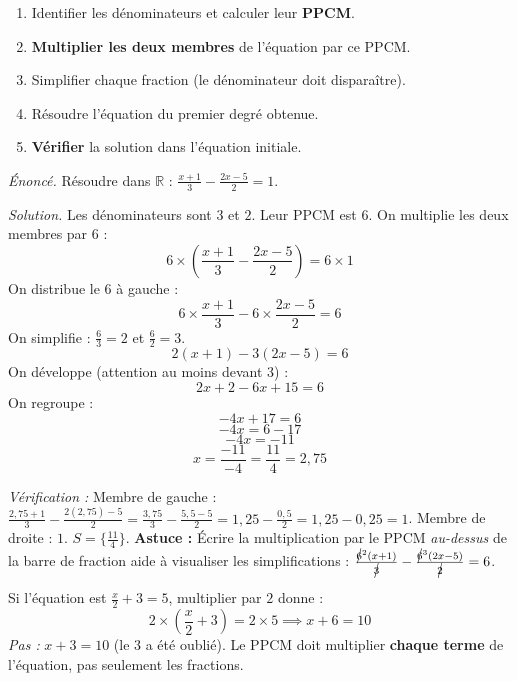 \documentclass[11pt]{article}
\begin{document}
\begin{methode}
\leavevmode
\begin{enumerate}
    \item Identifier les dénominateurs et calculer leur \textbf{PPCM}.
    \item \textbf{Multiplier les deux membres} de l'équation par ce PPCM.
    \item Simplifier chaque fraction (le dénominateur doit disparaître).
    \item Résoudre l'équation du premier degré obtenue.
    \item \textbf{Vérifier} la solution dans l'équation initiale.
\end{enumerate}
\end{methode}

\begin{exoresolu}[Équation fractionnaire : $\frac{x+1}{3} - \frac{2x-5}{2} = 1$]
\emph{Énoncé.} Résoudre dans $\mathbb{R}$ : $\frac{x+1}{3} - \frac{2x-5}{2} = 1$.

\emph{Solution.}
Les dénominateurs sont $3$ et $2$. Leur PPCM est $6$.
On multiplie les deux membres par $6$ :
\[ 6 \times \left( \frac{x+1}{3} - \frac{2x-5}{2} \right) = 6 \times 1 \]
On distribue le $6$ à gauche :
\[ 6 \times \frac{x+1}{3} - 6 \times \frac{2x-5}{2} = 6 \]
On simplifie : $\frac{6}{3}=2$ et $\frac{6}{2}=3$.
\[ 2(x+1) - 3(2x-5) = 6 \]
On développe (attention au moins devant $3$) :
\[ 2x + 2 - 6x + 15 = 6 \]
On regroupe :
\[ -4x + 17 = 6 \]
\[ -4x = 6 - 17 \]
\[ -4x = -11 \]
\[ x = \frac{-11}{-4} = \frac{11}{4} = 2,75 \]

\emph{Vérification :}
Membre de gauche : $\frac{2,75+1}{3} - \frac{2(2,75)-5}{2} = \frac{3,75}{3} - \frac{5,5-5}{2} = 1,25 - \frac{0,5}{2} = 1,25 - 0,25 = 1$.
Membre de droite : $1$. \quad $S = \{\frac{11}{4}\}$.
\tcblower
\textbf{Astuce :} Écrire la multiplication par le PPCM \emph{au-dessus} de la barre de fraction aide à visualiser les simplifications : $\frac{\cancel{6}^2(x+1)}{\cancel{3}} - \frac{\cancel{6}^3(2x-5)}{\cancel{2}} = 6$.
\end{exoresolu}

\begin{attention}
\leavevmode
Si l'équation est $\frac{x}{2} + 3 = 5$, multiplier par $2$ donne :
\[ 2 \times \left( \frac{x}{2} + 3 \right) = 2 \times 5 \implies x + 6 = 10 \]
\emph{Pas :} $x + 3 = 10$ (le $3$ a été oublié). Le PPCM doit multiplier \textbf{chaque terme} de l'équation, pas seulement les fractions.
\end{attention}
\end{document}
